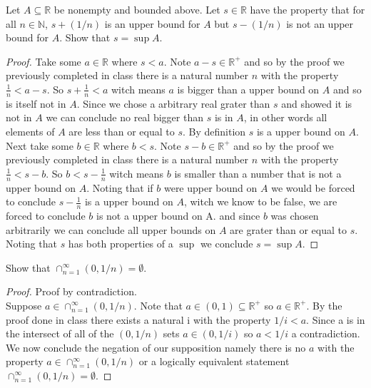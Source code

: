 \documentclass[12pt]{article}
\makeatletter
\theoremstyle{homework}
\newenvironment{exercise}[1]
{\def\@currentlabel{#1}\exercisecore}
{\endexercisecore}
\newcommand{\Reals}{\ensuremath{\mathbb R}}
\newcommand{\Nats}{\ensuremath{\mathbb N}}
\makeatother
\begin{document}
\newpage
\begin{exercise}{1.4.2}
Let $A\subseteq \Reals$ be nonempty and bounded above. Let $s\in\Reals$ have
the property that for all $n\in\Nats$, $s+(1/n)$ is an upper bound for $A$
but $s-(1/n)$ is not an upper bound for $A$.  Show that $s=\sup A$.
\end{exercise}
\begin{proof}
Take some $a\in\mathbb{R}$ where $s<a$.  Note $a-s\in \mathbb{R}^+$ and so by the proof we previously completed in class there is a natural number $n$ with the property $\frac{1}{n}<a-s$.  So $s+\frac{1}{n}<a$ witch means $a$ is bigger than a upper bound on $A$ and so is itself not in $A$.  Since we chose a arbitrary real grater than $s$ and showed it is not in $A$ we can conclude no real bigger than $s$ is in $A$, in other words all elements of $A$ are less than or equal to $s$.  By definition $s$ is a upper bound on $A$.\\
Next take some $b\in\mathbb{R}$ where $b<s$.  Note $s-b\in \mathbb{R}^+$ and so by the proof we previously completed in class there is a natural number $n$ with the property $\frac{1}{n}<s-b$.  So $b<s-\frac{1}{n}$ witch means $b$ is smaller than a number that is not a upper bound on $A$.  Noting that if $b$ were upper bound on $A$ we would be forced to conclude $s-\frac{1}{n}$ is a upper bound on $A$, witch we know to be false, we are forced to conclude $b$ is not a upper bound on A.  and since $b$ was chosen arbitrarily we can conclude all upper bounds on $A$ are grater than or equal to $s$.\\
Noting that $s$ has both properties of a $\sup$ we conclude $s=\sup A$.
\end{proof}


\begin{exercise}{1.4.3} Show that $\cap_{n=1}^\infty (0,1/n)=\emptyset$.
\end{exercise}
\begin{proof}
Proof by contradiction.\\
Suppose $a\in \cap_{n=1}^\infty (0,1/n)$.  Note that $a\in (0,1) \subseteq \mathbb{R}^+$ so $a\in\mathbb{R}^+$.  By the proof done in class there exists a natural i with the property $1/i<a$.  Since a is in the intersect of all of the $(0,1/n)$ sets $a\in (0,1/i)$ so $a<1/i$ a contradiction.  We now conclude the negation of our supposition namely there is no $a$ with the property $a\in \cap_{n=1}^\infty (0,1/n)$ or a logically equivalent statement $\cap_{n=1}^\infty (0,1/n)=\emptyset$.
\end{proof}
\end{document}
